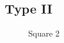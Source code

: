 \documentclass{article}
\begin{document}
\subsection{Type II}
\begin{figure}[H]
\centering 
\noindent{}%
\caption{Square 2}
\end{figure}
\end{document}
